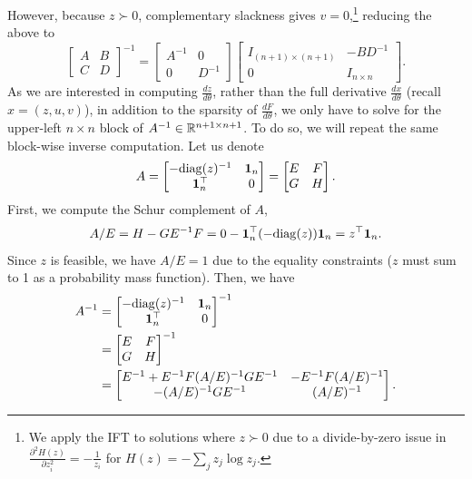 \documentclass[11pt]{article}
\begin{document}
However, because $z\succ 0$, complementary slackness gives $v = 0$,\footnote{
We apply the IFT to solutions where $z\succ 0$ due to a divide-by-zero issue
in $\frac{\partial^2 H(z)}{\partial z_i^2} = -\frac{1}{z_i}$ for $H(z) = -\sum_j z_j \log z_j$.
}
reducing the above to
\begin{equation*}
\begin{bmatrix}
A & B\\
C & D
\end{bmatrix}^{-1} = \begin{bmatrix}
    A^{-1} & 0\\
    0 & D^{-1}
\end{bmatrix}
\begin{bmatrix}
    I_{(n+1)\times (n+1)} & -BD^{-1}\\
    0 & I_{n \times n}
\end{bmatrix}.
\end{equation*}
As we are interested in computing $\frac{dz}{d\theta}$,
rather than the full derivative $\frac{dx}{d\theta}$ (recall $x = (z,u,v)$),
in addition to the sparsity of $\frac{dF}{d\theta}$, 
we only have to solve for the upper-left $n\times n$ block of $A^{-1}\in\mathbb{R}^{n+1\times n+1}$.
To do so, we will repeat the same block-wise inverse computation.
Let us denote
$$A
= \begin{bmatrix} -\mathrm{diag}(z)^{-1} & \mathbf{1}_n \\ \mathbf{1}_n^\top & 0 \end{bmatrix}
= \begin{bmatrix}E & F \\ G & H\end{bmatrix}.
$$
First, we compute the Schur complement of $A$,
\begin{equation}
A/E = H - GE^{-1}F = 0 - \mathbf{1}_n^\top(-\mathrm{diag}(z))\mathbf{1}_n = z^\top\mathbf{1}_n.
\end{equation}
Since $z$ is feasible, we have $A/E = 1$ due to the equality constraints
($z$ must sum to 1 as a probability mass function).
Then, we have
\begin{equation}
\begin{aligned}
A^{-1}
&= \begin{bmatrix}
    -\mathrm{diag}(z)^{-1} & \mathbf{1}_n\\
    \mathbf{1}^\top_n & 0
\end{bmatrix}^{-1}\\
&= \begin{bmatrix}E & F \\ G & H\end{bmatrix}^{-1}\\
&= \begin{bmatrix}
    E^{-1} + E^{-1}F(A/E)^{-1}GE^{-1} & -E^{-1}F(A/E)^{-1}\\
    -(A/E)^{-1}GE^{-1} & (A/E)^{-1}
\end{bmatrix}.
\end{aligned}
\end{equation}
\end{document}
